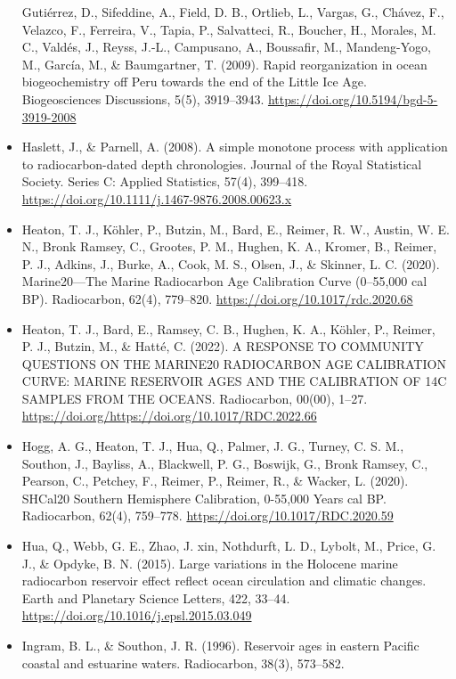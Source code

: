\documentclass[
]{article}
\begin{document}
\begin{itemize}
  Gutiérrez, D., Sifeddine, A., Field, D. B., Ortlieb, L., Vargas, G.,
  Chávez, F., Velazco, F., Ferreira, V., Tapia, P., Salvatteci, R.,
  Boucher, H., Morales, M. C., Valdés, J., Reyss, J.-L., Campusano, A.,
  Boussafir, M., Mandeng-Yogo, M., García, M., \& Baumgartner, T.
  (2009). Rapid reorganization in ocean biogeochemistry off Peru towards
  the end of the Little Ice Age. Biogeosciences Discussions, 5(5),
  3919--3943. \url{https://doi.org/10.5194/bgd-5-3919-2008}
\item
  Haslett, J., \& Parnell, A. (2008). A simple monotone process with
  application to radiocarbon-dated depth chronologies. Journal of the
  Royal Statistical Society. Series C: Applied Statistics, 57(4),
  399--418. \url{https://doi.org/10.1111/j.1467-9876.2008.00623.x}
\item
  Heaton, T. J., Köhler, P., Butzin, M., Bard, E., Reimer, R. W.,
  Austin, W. E. N., Bronk Ramsey, C., Grootes, P. M., Hughen, K. A.,
  Kromer, B., Reimer, P. J., Adkins, J., Burke, A., Cook, M. S., Olsen,
  J., \& Skinner, L. C. (2020). Marine20---The Marine Radiocarbon Age
  Calibration Curve (0--55,000 cal BP). Radiocarbon, 62(4), 779--820.
  \url{https://doi.org/10.1017/rdc.2020.68}
\item
  Heaton, T. J., Bard, E., Ramsey, C. B., Hughen, K. A., Köhler, P.,
  Reimer, P. J., Butzin, M., \& Hatté, C. (2022). A RESPONSE TO
  COMMUNITY QUESTIONS ON THE MARINE20 RADIOCARBON AGE CALIBRATION CURVE:
  MARINE RESERVOIR AGES AND THE CALIBRATION OF 14C SAMPLES FROM THE
  OCEANS. Radiocarbon, 00(00), 1--27.
  \url{https://doi.org/https://doi.org/10.1017/RDC.2022.66}
\item
  Hogg, A. G., Heaton, T. J., Hua, Q., Palmer, J. G., Turney, C. S. M.,
  Southon, J., Bayliss, A., Blackwell, P. G., Boswijk, G., Bronk Ramsey,
  C., Pearson, C., Petchey, F., Reimer, P., Reimer, R., \& Wacker, L.
  (2020). SHCal20 Southern Hemisphere Calibration, 0-55,000 Years cal
  BP. Radiocarbon, 62(4), 759--778.
  \url{https://doi.org/10.1017/RDC.2020.59}
\item
  Hua, Q., Webb, G. E., Zhao, J. xin, Nothdurft, L. D., Lybolt, M.,
  Price, G. J., \& Opdyke, B. N. (2015). Large variations in the
  Holocene marine radiocarbon reservoir effect reflect ocean circulation
  and climatic changes. Earth and Planetary Science Letters, 422,
  33--44. \url{https://doi.org/10.1016/j.epsl.2015.03.049}
\item
  Ingram, B. L., \& Southon, J. R. (1996). Reservoir ages in eastern
  Pacific coastal and estuarine waters. Radiocarbon, 38(3), 573--582.

\end{itemize}
\end{document}
